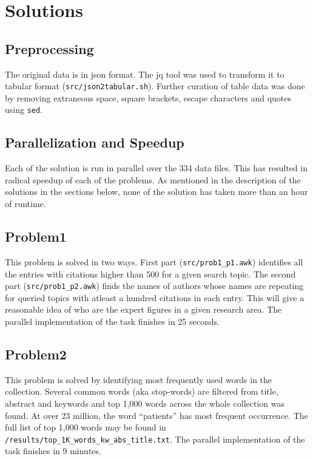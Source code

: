 \documentclass{article}
\begin{document}
\section*{Solutions}
\subsection*{Preprocessing}
The original data is in json format. The jq tool was used to transform it to
tabular format (\texttt{src/json2tabular.sh}). Further curation of table data
was done by removing extraneous space, square brackets, escape characters and
quotes using \texttt{sed}.

\subsection*{Parallelization and Speedup}
Each of the solution is run in parallel over the 334 data files. This has
resulted in radical speedup of each of the problems. As mentioned in the
description of the solutions in the sections below, none of the solution has
taken more than an hour of runtime.

\subsection*{Problem1}
This problem is solved in two ways. First part (\texttt{src/prob1\_p1.awk}) identifies
all the entries with citations higher than 500 for a given search topic. The
second part (\texttt{src/prob1\_p2.awk}) finds the names of authors whose names
are repeating for queried topics with atleast a hundred citations in each
entry. This will give a reasonable idea of who are the expert figures in a
given research area. The parallel implementation of the task finishes in 25
seconds.

\subsection*{Problem2}
This problem is solved by identifying most frequently used words in the
collection. Several common words (aka stop-words) are filtered from title,
abstract and keywords and top 1,000 words across the whole collection was
found. At over 23 million, the word ``patients'' has most frequent occurrence.
The full list of top 1,000 words may be found in
\texttt{/results/top\_1K\_words\_kw\_abs\_title.txt}.  The parallel
implementation of the task finishes in 9 minutes.
\end{document}
